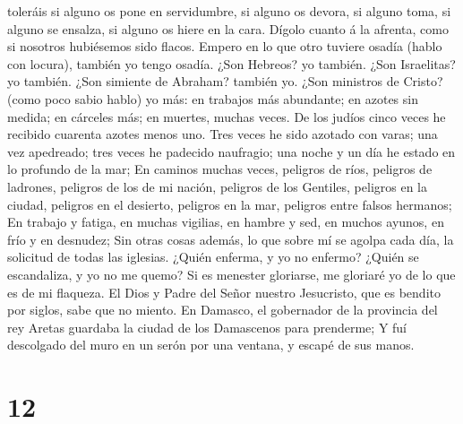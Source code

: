 toleráis si alguno os pone en servidumbre, si alguno os devora, si
alguno toma, si alguno se ensalza, si alguno os hiere en la cara.
 Dígolo cuanto á la afrenta, como si nosotros hubiésemos
sido flacos. Empero en lo que otro tuviere osadía (hablo con locura),
también yo tengo osadía.  ¿Son Hebreos? yo también. ¿Son
Israelitas? yo también. ¿Son simiente de Abraham? también yo.
 ¿Son ministros de Cristo? (como poco sabio hablo) yo
más: en trabajos más abundante; en azotes sin medida; en cárceles más;
en muertes, muchas veces.  De los judíos cinco veces he
recibido cuarenta azotes menos uno.  Tres veces he sido
azotado con varas; una vez apedreado; tres veces he padecido naufragio;
una noche y un día he estado en lo profundo de la mar; 
En caminos muchas veces, peligros de ríos, peligros de ladrones,
peligros de los de mi nación, peligros de los Gentiles, peligros en la
ciudad, peligros en el desierto, peligros en la mar, peligros entre
falsos hermanos;  En trabajo y fatiga, en muchas
vigilias, en hambre y sed, en muchos ayunos, en frío y en desnudez;
 Sin otras cosas además, lo que sobre mí se agolpa cada
día, la solicitud de todas las iglesias.  ¿Quién enferma,
y yo no enfermo? ¿Quién se escandaliza, y yo no me quemo?
 Si es menester gloriarse, me gloriaré yo de lo que es de
mi flaqueza.  El Dios y Padre del Señor nuestro
Jesucristo, que es bendito por siglos, sabe que no miento.
 En Damasco, el gobernador de la provincia del rey Aretas
guardaba la ciudad de los Damascenos para prenderme;  Y
fuí descolgado del muro en un serón por una ventana, y escapé de sus
manos.

\hypertarget{section-11}{%
\section{12}\label{section-11}}

